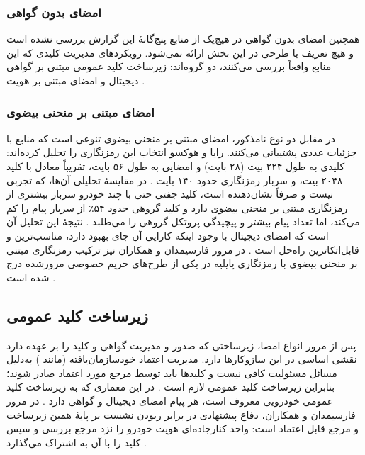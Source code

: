\subsubsection{امضای بدون گواهی}

همچنین امضای بدون گواهی در هیچ‌یک از منابع پنج‌گانهٔ این گزارش بررسی نشده است و هیچ تعریف یا طرحی در این بخش ارائه نمی‌شود. رویکردهای مدیریت کلیدی که این منابع واقعاً بررسی می‌کنند، دو گروه‌اند: زیرساخت کلید عمومی مبتنی بر گواهی دیجیتال \cite{SecuringVehicularAd} و امضای مبتنی بر هویت \cite{linGSISSecurePrivacyPreserving2007}.

\subsubsection{امضای مبتنی بر منحنی بیضوی}

در مقابل دو نوع نامذکور، امضای مبتنی بر منحنی بیضوی تنوعی است که منابع با جزئیات عددی پشتیبانی می‌کنند. رایا و هوکسو انتخاب این رمزنگاری را تحلیل کرده‌اند: کلیدی به طول ۲۲۴ بیت (۲۸ بایت) و امضایی به طول ۵۶ بایت، تقریباً معادل  با کلید ۲۰۴۸ بیت، و سربار رمزنگاری حدود ۱۴۰ بایت \cite{SecuringVehicularAd}. در مقایسهٔ تحلیلی آن‌ها، که تجربی نیست و صرفاً نشان‌دهنده است، کلید جفتی حتی با چند خودرو سربار بیشتری از رمزنگاری مبتنی بر منحنی بیضوی دارد و کلید گروهی حدود ۵۴٪ از سربار پیام را کم می‌کند، اما تعداد پیام بیشتر و پیچیدگی پروتکل گروهی را می‌طلبد \cite{SecuringVehicularAd}. نتیجهٔ این تحلیل آن است که امضای دیجیتال با وجود اینکه کارایی آن جای بهبود دارد، مناسب‌ترین و قابل‌اتکاترین راه‌حل است \cite{SecuringVehicularAd}. در مرور فارسیمدان و همکاران نیز ترکیب رمزنگاری مبتنی بر منحنی بیضوی با رمزنگاری پایلیه در یکی از طرح‌های حریم خصوصی مرورشده درج شده است \cite{farsimadanReviewSecurityChallenges2025}.

\subsection{زیرساخت کلید عمومی}

پس از مرور انواع امضا، زیرساختی که صدور و مدیریت گواهی و کلید را بر عهده دارد نقشی اساسی در این سازوکارها دارد. مدیریت اعتماد خودسازمان‌یافته (مانند ) به‌دلیل مسائل مسئولیت کافی نیست و کلیدها باید توسط مرجع مورد اعتماد صادر شوند؛ بنابراین زیرساخت کلید عمومی لازم است \cite{SecuringVehicularAd}. در این معماری که به زیرساخت کلید عمومی خودرویی معروف است، هر پیام امضای دیجیتال و گواهی  دارد \cite{SecuringVehicularAd}. در مرور فارسیمدان و همکاران، دفاع پیشنهادی در برابر ربودن نشست بر پایهٔ همین زیرساخت و مرجع قابل اعتماد است: واحد کنارجاده‌ای هویت خودرو را نزد مرجع بررسی و سپس کلید را با آن به اشتراک می‌گذارد \cite{farsimadanReviewSecurityChallenges2025}.

